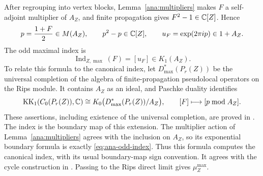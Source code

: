 After regrouping into vertex blocks, Lemma~\ref{ana:multipliers} makes
$F$ a self-adjoint multiplier of $A_Z$, and finite propagation gives
$F^2-1\in\mathbb C[Z]$.  Hence
\[
 p=\frac{1+F}{2}\in M(A_Z),\qquad
 p^2-p\in\mathbb C[Z],\qquad
 u_F=\exp(2\pi i p)\in 1+A_Z.
\]
The odd maximal index is
\begin{equation}
 \label{eq:ana-odd-index}
 \operatorname{Ind}_{Z,\max}(F)=[u_F]\in K_1(A_Z).
\end{equation}
To relate this formula to the canonical index, let
$D^*_{\max}(P_r(Z))$ be the universal completion of the algebra of
finite-propagation pseudolocal operators on the Rips module.  It contains
$A_Z$ as an ideal, and Paschke duality identifies
\[
 \operatorname{KK}_1(C_0(P_r(Z)),\mathbb C)
 \cong K_0\bigl(D^*_{\max}(P_r(Z))/A_Z\bigr),
 \qquad [F]\longmapsto[p\bmod A_Z].
\]
These assertions, including existence of the universal completion, are
proved in \cite[Proposition~2.22, Propositions~2.27--2.28, and
Corollary~2.29]{SS21}.  The index is the boundary map of this extension.
The multiplier action of Lemma~\ref{ana:multipliers} agrees with the
inclusion on $A_Z$, so its exponential boundary formula is exactly
\eqref{eq:ana-odd-index}.  Thus this formula computes the canonical index,
with its usual boundary-map sign convention.  It agrees with the cycle
construction in \cite[Corollary~2.18]{OOY09}.  Passing to the Rips direct
limit gives $\mu_Z^{\max}$.



